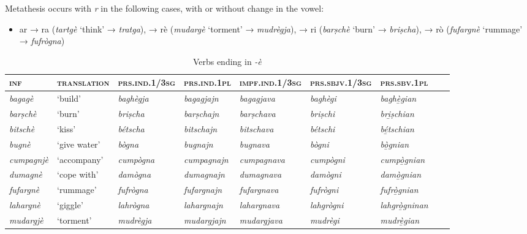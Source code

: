 Metathesis occurs with \textit{r} in the following cases, with or without change in the vowel:

\begin{itemize}
	\item ar → ra (\textit{tartgè} `think' → \textit{tratga}), → rè (\textit{mudargè} `torment' → \textit{mudrègja}), → ri (\textit{barṣchè} `burn' → \textit{briṣcha}), → rò (\textit{fufargnè} `rummage' → \textit{fufrògna})
\end{itemize}

\begin{sidewaystable} 
	\caption{Verbs ending in \textit{-è}}
	\label{stemalte}
	\begin{tabularx}{\textwidth}{lllllllll} 
		\lsptoprule
		\textsc{\textbf{inf}} & \textsc{\textbf{translation}} & \textsc{\textbf{prs.ind.1/3sg}} & \textsc{\textbf{prs.ind.1pl}} & \textsc{\textbf{impf.ind.1/3sg}} & \textsc{\textbf{prs.sbjv.1/3sg}} & \textsc{\textbf{prs.sbv.1pl}} \\
		\midrule
		\textit{bagagè} & ‘build’ & \textit{baghègja} & \textit{bagagjajn} & \textit{bagagjava} & \textit{baghègi} & \textit{baghè̱gian}\\
		\textit{barṣchè} & ‘burn’ & \textit{briṣcha} & \textit{barṣchajn} & \textit{barṣchava} & \textit{briṣchi} & \textit{bri̱ṣchian}\\
		\textit{bitschè} & ‘kiss’ & \textit{bétscha} & \textit{bitschajn} & \textit{bitschava} & \textit{bétschi} & \textit{bé̱tschian}\\
		\textit{bugnè} & ‘give water’ & \textit{bògna} & \textit{bugnajn} & \textit{bugnava} & \textit{bògni} & \textit{bò̱gnian}\\
		\textit{cumpagnjè} & ‘accompany’ & \textit{cumpògna} & \textit{cumpagnajn} & \textit{cumpagnava} & \textit{cumpògni} & \textit{cumpò̱gnian}\\
		\textit{dumagnè} & `cope with' & \textit{damògna} & \textit{dumagnajn} & \textit{dumagnava} & \textit{damògni} & \textit{damò̱gnian}\\
		\textit{fufargnè} & ‘rummage’ & \textit{fufrògna} & \textit{fufargnajn} & \textit{fufargnava} & \textit{fufrògni} & \textit{fufrò̱gnian}\\
		\textit{lahargnè} & `giggle' & \textit{lahrògna} & \textit{lahargnajn}& \textit{lahargnava} & \textit{lahgrògni} & \textit{lahgrò̱gninan}\\
		\textit{mudargjè} & `torment' & \textit{mudrègja} & \textit{mudargjajn} & \textit{mudargjava} & \textit{mudrègi} & \textit{mudrè̱gian} \\

\end{tabularx}
\end{sidewaystable}
